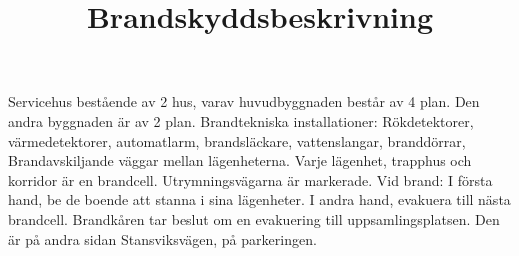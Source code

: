 \title{
Brandskyddsbeskrivning
}
Servicehus bestående av 2 hus, varav huvudbyggnaden består av 4 plan. Den andra byggnaden är av 2 plan.
Brandtekniska installationer: Rökdetektorer, värmedetektorer, automatlarm, brandsläckare, vattenslangar, branddörrar, Brandavskiljande väggar mellan lägenheterna.
Varje lägenhet, trapphus och korridor är en brandcell.
Utrymningsvägarna är markerade.
Vid brand: I första hand, be de boende att stanna i sina lägenheter.
I andra hand, evakuera till nästa brandcell. Brandkåren tar beslut om en evakuering till uppsamlingsplatsen. Den är på andra sidan Stansviksvägen, på parkeringen.